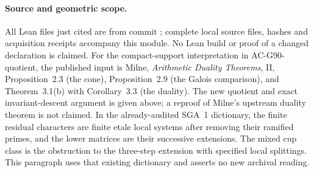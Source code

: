 \paragraph{Source and geometric scope.}
All Lean files just cited are from commit
; complete local
source files, hashes and acquisition receipts accompany this module.
No Lean build or proof of a changed declaration is claimed.
For the compact-support interpretation in AC-G90-quotient, the
published input is Milne, \emph{Arithmetic Duality Theorems},
II, Proposition~2.3 (the cone), Proposition~2.9 (the Galois
comparison), and Theorem~3.1(b) with Corollary~3.3 (the duality).
The new quotient and exact invariant-descent argument is given
above; a reproof of Milne's upstream duality theorem is not claimed.
In the already-audited SGA~1 dictionary, the finite residual
characters are finite etale local systems after removing their
ramified primes, and the lower matrices are their successive
extensions.  The mixed cup class is the obstruction to the
three-step extension with specified local splittings.  This paragraph
uses that existing dictionary and asserts no new archival reading.
